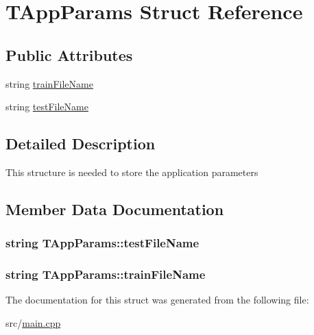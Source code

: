 \hypertarget{struct_t_app_params}{}\section{T\+App\+Params Struct Reference}
\label{struct_t_app_params}
\subsection*{Public Attributes}
\begin{DoxyCompactItemize}
\item 
string \hyperlink{struct_t_app_params_a063fb4df929a287131eecbaa44b02d90}{train\+File\+Name}
\item 
string \hyperlink{struct_t_app_params_aa507fd765fbe8670bd55bb79f978a1ba}{test\+File\+Name}
\end{DoxyCompactItemize}


\subsection{Detailed Description}
This structure is needed to store the application parameters 

\subsection{Member Data Documentation}
\hypertarget{struct_t_app_params_aa507fd765fbe8670bd55bb79f978a1ba}{}
\subsubsection[{test\+File\+Name}]{\setlength{\rightskip}{0pt plus 5cm}string T\+App\+Params\+::test\+File\+Name}\label{struct_t_app_params_aa507fd765fbe8670bd55bb79f978a1ba}
\hypertarget{struct_t_app_params_a063fb4df929a287131eecbaa44b02d90}{}
\subsubsection[{train\+File\+Name}]{\setlength{\rightskip}{0pt plus 5cm}string T\+App\+Params\+::train\+File\+Name}\label{struct_t_app_params_a063fb4df929a287131eecbaa44b02d90}


The documentation for this struct was generated from the following file\+:\begin{DoxyCompactItemize}
\item 
src/\hyperlink{main_8cpp}{main.\+cpp}\end{DoxyCompactItemize}
